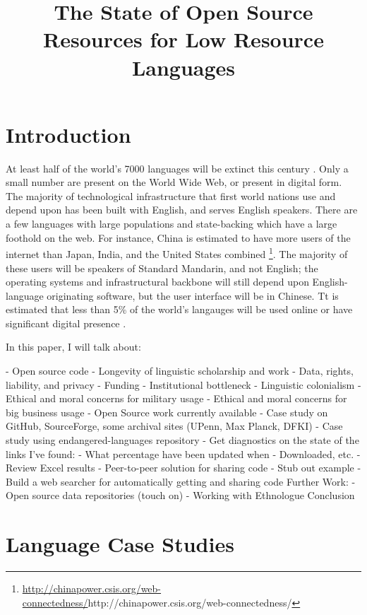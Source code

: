 \documentclass[10pt, a4paper]{article}
\title{The State of Open Source Resources for Low Resource Languages}
\begin{document}
\maketitleabstract

\tableofcontents

\section{Introduction}

At least half of the world's 7000 languages will be extinct this century \cite[p. 27]{grenoble_2011}. Only a small number are present on the World Wide Web, or present in digital form. The majority of technological infrastructure that first world nations use and depend upon has been built with English, and serves English speakers. There are a few languages with large populations and state-backing which have a large foothold on the web. For instance, China is estimated to have more users of the internet than Japan, India, and the United States combined \footnote{\url{http://chinapower.csis.org/web-connectedness/}{http://chinapower.csis.org/web-connectedness/}}. The majority of these users will be speakers of Standard Mandarin, and not English; the operating systems and infrastructural backbone will still depend upon English-language originating software, but the user interface will be in Chinese. Tt is estimated that less than 5\% of the world's langauges will be used online or have significant digital presence \cite{kornai2013digital}.

In this paper, I will talk about:

- Open source code
  -  Longevity of linguistic scholarship and work
  - Data, rights, liability, and privacy
  - Funding
    - Institutional bottleneck
    - Linguistic colonialism
    - Ethical and moral concerns for military usage
    - Ethical and moral concerns for big business usage
- Open Source work currently available
  - Case study on GitHub, SourceForge, some archival sites (UPenn, Max Planck, DFKI)
- Case study using endangered-languages repository
  - Get diagnostics on the state of the links I've found:
    - What percentage have been updated when
    - Downloaded, etc.
  - Review Excel results
- Peer-to-peer solution for sharing code
  - Stub out example
  - Build a web searcher for automatically getting and sharing code
Further Work:
  - Open source data repositories (touch on)
  - Working with Ethnologue
Conclusion


\section{Language Case Studies}
\end{document}
